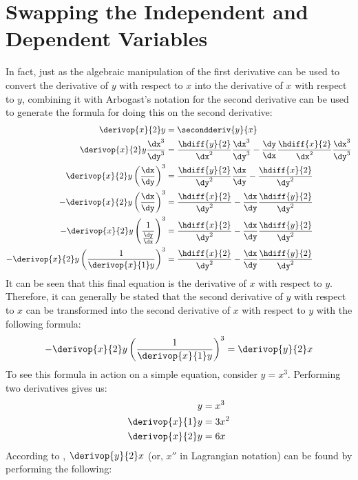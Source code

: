 \section{Swapping the Independent and Dependent Variables}
\label{secswapping}

In fact, just as the algebraic manipulation of the first derivative can be used to convert the derivative of $y$ with respect to $x$ into the derivative of $x$ with respect to $y$, combining it with Arbogast's notation for the second derivative can be used to generate the formula for doing this on the second derivative:
\begin{align*}
\derivop{x}{2}y &= \secondderiv{y}{x} \\
\derivop{x}{2}y \frac{\dx^3}{\dy^3} &= \frac{\hdiff{y}{2}}{\dx^2} \frac{\dx^3}{\dy^3} - \frac{\dy}{\dx}\frac{\hdiff{x}{2}}{\dx^2} \frac{\dx^3}{\dy^3} \\
\derivop{x}{2}y \left(\frac{\dx}{\dy}\right)^3 &= \frac{\hdiff{y}{2}}{\dy^2} \frac{\dx}{\dy} - \frac{\hdiff{x}{2}}{\dy^2} \\
- \derivop{x}{2}y \left(\frac{\dx}{\dy}\right)^3 &= \frac{\hdiff{x}{2}}{\dy^2} - \frac{\dx}{\dy} \frac{\hdiff{y}{2}}{\dy^2} \\
- \derivop{x}{2}y \left(\frac{1}{\frac{\dy}{\dx}}\right)^3 &= \frac{\hdiff{x}{2}}{\dy^2} - \frac{\dx}{\dy}\frac{\hdiff{y}{2}}{\dy^2}  \\
- \derivop{x}{2}y \left(\frac{1}{\derivop{x}{1}y}\right)^3 &= \frac{\hdiff{x}{2}}{\dy^2} - \frac{\dx}{\dy}\frac{\hdiff{y}{2}}{\dy^2} 
\end{align*}
It can be seen that this final equation is the derivative of $x$ with respect to $y$.
Therefore, it can generally be stated that the second derivative of $y$ with respect to $x$ can be transformed into the second derivative of $x$ with respect to $y$ with the following formula:
\begin{equation}\label{inverse}
- \derivop{x}{2}y \left(\frac{1}{\derivop{x}{1}y}\right)^3 = \derivop{y}{2}x
\end{equation}
To see this formula in action on a simple equation, consider $y = x^3$.  
Performing two derivatives gives us:
\begin{align}
y &= x^3 \label{inverseexorig} \\
\derivop{x}{1}y &= 3x^2 \\
\derivop{x}{2}y &= 6x
\end{align}
According to , $\derivop{y}{2}x$ (or, $x''$ in Lagrangian notation) can be found by performing the following:
